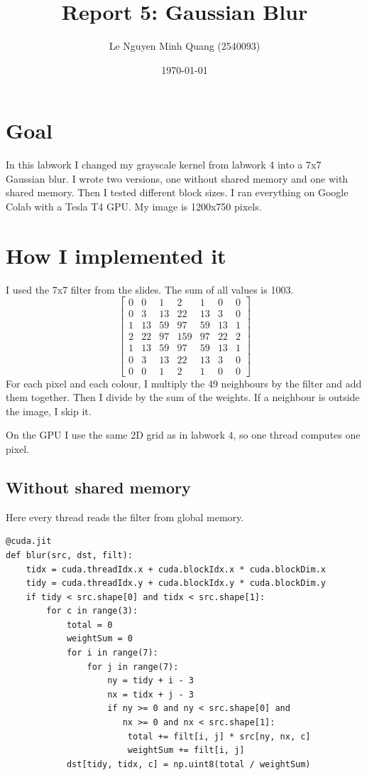 \documentclass[11pt,a4paper]{article}
\title{Report 5: Gaussian Blur}
\author{Le Nguyen Minh Quang (2540093)}
\date{\today}
\begin{document}
\maketitle

\section{Goal}
In this labwork I changed my grayscale kernel from labwork 4 into a 7x7
Gaussian blur. I wrote two versions, one without shared memory and one
with shared memory. Then I tested different block sizes. I ran
everything on Google Colab with a Tesla T4 GPU. My image is 1200x750
pixels.

\section{How I implemented it}
I used the 7x7 filter from the slides. The sum of all values is 1003.
\[
\begin{bmatrix}
0 & 0 & 1 & 2 & 1 & 0 & 0 \\
0 & 3 & 13 & 22 & 13 & 3 & 0 \\
1 & 13 & 59 & 97 & 59 & 13 & 1 \\
2 & 22 & 97 & 159 & 97 & 22 & 2 \\
1 & 13 & 59 & 97 & 59 & 13 & 1 \\
0 & 3 & 13 & 22 & 13 & 3 & 0 \\
0 & 0 & 1 & 2 & 1 & 0 & 0
\end{bmatrix}
\]
For each pixel and each colour, I multiply the 49 neighbours by the
filter and add them together. Then I divide by the sum of the weights.
If a neighbour is outside the image, I skip it.

On the GPU I use the same 2D grid as in labwork 4, so one thread
computes one pixel.

\subsection{Without shared memory}
Here every thread reads the filter from global memory.
\begin{verbatim}
@cuda.jit
def blur(src, dst, filt):
    tidx = cuda.threadIdx.x + cuda.blockIdx.x * cuda.blockDim.x
    tidy = cuda.threadIdx.y + cuda.blockIdx.y * cuda.blockDim.y
    if tidy < src.shape[0] and tidx < src.shape[1]:
        for c in range(3):
            total = 0
            weightSum = 0
            for i in range(7):
                for j in range(7):
                    ny = tidy + i - 3
                    nx = tidx + j - 3
                    if ny >= 0 and ny < src.shape[0] and
                       nx >= 0 and nx < src.shape[1]:
                        total += filt[i, j] * src[ny, nx, c]
                        weightSum += filt[i, j]
            dst[tidy, tidx, c] = np.uint8(total / weightSum)
\end{verbatim}
\end{document}
